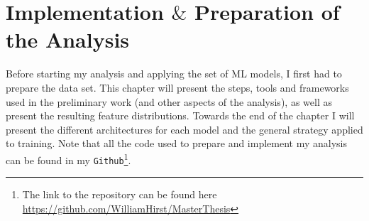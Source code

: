 \chapter{Implementation $\&$ Preparation of the Analysis}\label{chap:Implementation}
Before starting my analysis and applying the set of \ac{ML} models, I first had to prepare the data set. This chapter 
will present the steps, tools and frameworks used in the preliminary work (and other aspects of the analysis), as well as present the 
resulting feature distributions. Towards the end of the chapter I will present the different architectures for each model and the general 
strategy applied to training. Note that all the code used to prepare and implement my analysis can be found in my \verb!Github!\footnote{
The link to the repository can be found here \url{https://github.com/WilliamHirst/MasterThesis}}.


